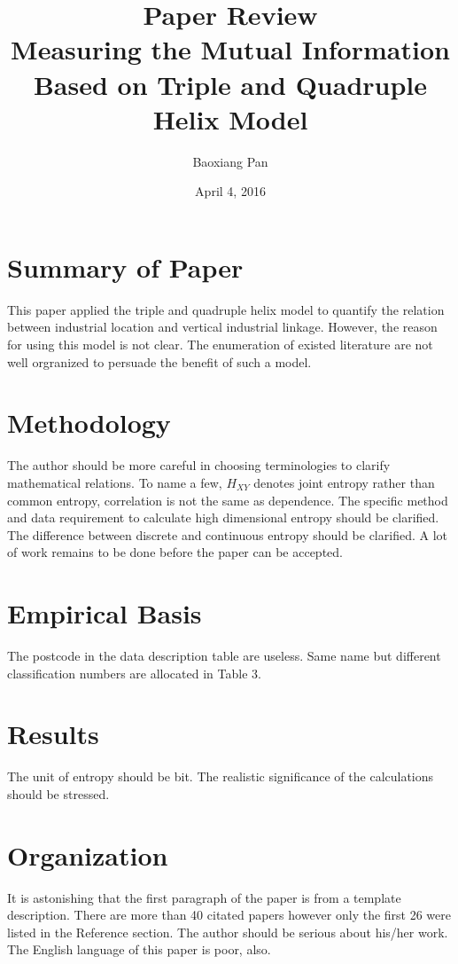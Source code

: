\documentclass{article}
\title{Paper Review \\ Measuring the Mutual Information Based on Triple and Quadruple Helix Model}
\author{Baoxiang Pan}
\date{April 4, 2016}
\begin{document}
\maketitle
\section{Summary of Paper}
This paper applied the triple and quadruple helix model to quantify the relation between industrial location and vertical industrial linkage. However, the reason for using this model is not clear. The enumeration of existed literature are not well orgranized to persuade the benefit of such a model.
\section{Methodology}
The author should be more careful in choosing terminologies to clarify mathematical relations. To name a few, $H_{XY}$ denotes joint entropy rather than common entropy, correlation is not the same as dependence. The specific method and data requirement to calculate high dimensional entropy should be clarified. The difference between discrete and continuous entropy should be clarified. A lot of work remains to be done before the paper can be accepted.
\section{Empirical Basis}
The postcode in the data description table are useless. Same name but different classification numbers are allocated in Table 3. 
\section{Results}
The unit of entropy should be bit. The realistic significance of the calculations should be stressed.
\section{Organization}
It is astonishing that the first paragraph of the paper is from a template description. There are more than 40 citated papers however only the first 26 were listed in the Reference section. The author should be serious about his/her work. The English language of this paper is poor, also. 
\end{document}
